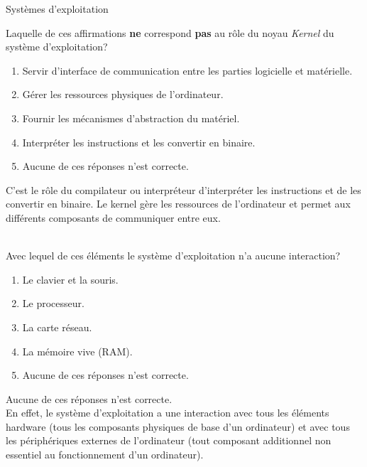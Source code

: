 \begin{section}{Systèmes d'exploitation}
    \begin{Exercice}[2 minutes]
       Laquelle de ces affirmations \textbf{ne} correspond \textbf{pas} au rôle du noyau \textit{Kernel} du système d'exploitation?
        \begin{enumerate}
            \item Servir d'interface de communication entre les parties logicielle et matérielle.
            \item Gérer les ressources physiques de l'ordinateur.
            \item Fournir les mécanismes d'abstraction du matériel.
            \item Interpréter les instructions et les convertir en binaire.
            \item Aucune de ces réponses n'est correcte.
        \end{enumerate}
    \end{Exercice}
    \begin{solution}
                C'est le rôle du compilateur ou interpréteur d'interpréter les instructions et de les convertir en binaire. Le kernel gère les ressources de l'ordinateur et permet aux différents composants de communiquer entre eux.
    \end{solution}
    
    \begin{Exercice}[2 minutes]\\
    Avec lequel de ces éléments le système d'exploitation n'a aucune interaction?
        \begin{enumerate}
            \item Le clavier et la souris.
            \item Le processeur.
            \item La carte réseau.
            \item La mémoire vive (RAM).
            \item Aucune de ces réponses n'est correcte.
        \end{enumerate}
    \end{Exercice}
    \begin{solution}
        Aucune de ces réponses n'est correcte. \\
        
	    En effet, le système d'exploitation a une interaction avec tous les éléments hardware (tous les composants physiques de base d'un ordinateur) et avec tous les périphériques externes de l'ordinateur (tout composant additionnel non essentiel au fonctionnement d'un ordinateur).  \\
    \end{solution}



\end{section}
